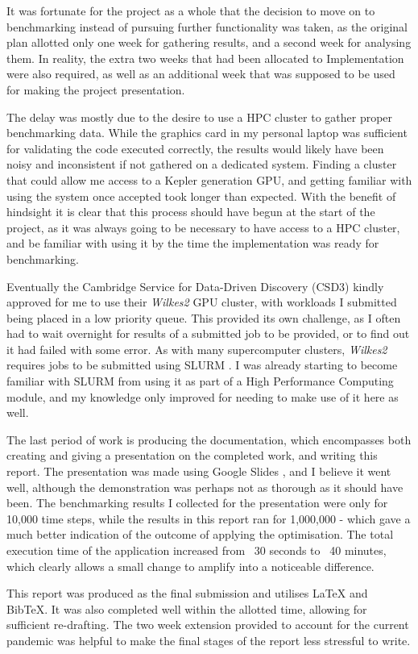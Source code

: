 It was fortunate for the project as a whole that the decision to move on to benchmarking instead of pursuing further functionality was taken, as the original plan allotted only one week for gathering results, and a second week for analysing them. In reality, the extra two weeks that had been allocated to Implementation were also required, as well as an additional week that was supposed to be used for making the project presentation.
\par
The delay was mostly due to the desire to use a HPC cluster to gather proper benchmarking data. While the graphics card in my personal laptop was sufficient for validating the code executed correctly, the results would likely have been noisy and inconsistent if not gathered on a dedicated system. Finding a cluster that could allow me access to a Kepler generation GPU, and getting familiar with using the system once accepted took longer than expected. With the benefit of hindsight it is clear that this process should have begun at the start of the project, as it was always going to be necessary to have access to a HPC cluster, and be familiar with using it by the time the implementation was ready for benchmarking.
\par
Eventually the Cambridge Service for Data-Driven Discovery (CSD3) kindly approved for me to use their \textit{Wilkes2} GPU cluster, with workloads I submitted being placed in a low priority queue. This provided its own challenge, as I often had to wait overnight for results of a submitted job to be provided, or to find out it had failed with some error. As with many supercomputer clusters, \textit{Wilkes2} requires jobs to be submitted using SLURM \cite{slurm}. I was already starting to become familiar with SLURM from using it as part of a High Performance Computing module, and my knowledge only improved for needing to make use of it here as well.

The last period of work is producing the documentation, which encompasses both creating and giving a presentation on the completed work, and writing this report. The presentation was made using Google Slides \cite{gslides}, and I believe it went well, although the demonstration was perhaps not as thorough as it should have been. The benchmarking results I collected for the presentation were only for 10,000 time steps, while the results in this report ran for 1,000,000 - which gave a much better indication of the outcome of applying the optimisation. The total execution time of the application increased from ~30 seconds to ~40 minutes, which clearly allows a small change to amplify into a noticeable difference.
\par
This report was produced as the final submission and utilises LaTeX and BibTeX. It was also completed well within the allotted time, allowing for sufficient re-drafting. The two week extension provided to account for the current pandemic was helpful to make the final stages of the report less stressful to write.

